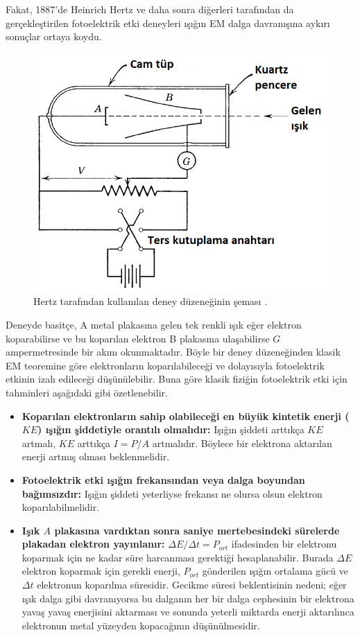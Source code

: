 \documentclass[a4paper,12pt, twoside]{article}
\begin{document}
Fakat, 1887'de Heinrich Hertz ve daha sonra diğerleri tarafından da gerçekleştirilen fotoelektrik etki deneyleri ışığın EM dalga davranışına aykırı sonuçlar ortaya koydu.
\begin{figure}[hbtp]
\center
\includegraphics[scale=.5]{fotoeletrik_deney_devresi.png}
\caption{Hertz tarafından kullanılan deney düzeneğinin şeması \cite{book:EisbergResnick}.}
\label{fig:fotoeletrik_devresi}
\end{figure}
Deneyde basitçe, A metal plakasına gelen tek renkli ışık eğer elektron koparabilirse ve bu koparılan elektron B plakasına ulaşabilirse $G$ ampermetresinde bir akım okunmaktadır. Böyle bir deney düzeneğinden klasik EM teoremine göre elektronların koparılabileceği ve dolayısıyla fotoelektrik etkinin izah edileceği düşünülebilir. Buna göre klasik fiziğin fotoelektrik etki için tahminleri \cite{book:KraneS} aşağıdaki gibi özetlenebilir.
\begin{itemize}
\item {\bf Koparılan elektronların sahip olabileceği en büyük kintetik enerji ($KE$) ışığın şiddetiyle orantılı olmalıdır:} Işığın şiddeti arttıkça $KE$ artmalı, $KE$ arttıkça $I=P/A$ artmalıdır. Böylece bir elektrona aktarılan enerji artmış olması beklenmelidir.

\item {\bf Fotoelektrik etki ışığın frekansından veya dalga boyundan bağımsızdır:} Işığın şiddeti yeterliyse frekansı ne olursa olsun elektron koparılabilmelidir.

\item {\bf Işık $A$ plakasına vardıktan sonra saniye mertebesindeki sürelerde plakadan elektron yayınlanır:} $\Delta E/\Delta t = P_{ort}$ ifadesinden bir elektronu koparmak için ne kadar süre harcanması gerektiği hesaplanabilir. Burada $\Delta E$ elektron koparmak için gerekli enerji, $P_{ort}$ gönderilen ışığın ortalama gücü ve $\Delta t$ elektronun koparılma süresidir. Gecikme süresi beklentisinin nedeni; eğer ışık dalga gibi davranıyorsa bu dalganın her bir dalga cephesinin bir elektrona yavaş yavaş enerjisini aktarması ve sonunda yeterli miktarda enerji aktarılınca elektronun metal yüzeyden kopacağının düşünülmesidir.
\end{itemize}
\end{document}
